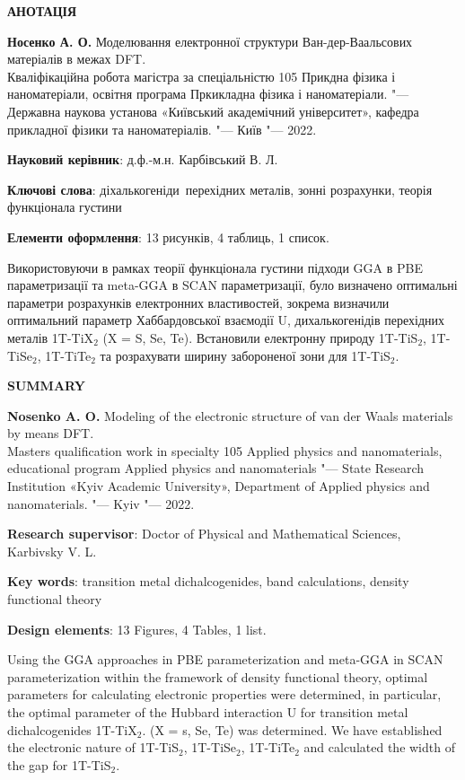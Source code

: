 \begin{center}
{\large \textbf{АНОТАЦІЯ}}
\end{center}

\textbf{Носенко А. О.} Моделювання електронної структури Ван-дер-Ваальсових матеріалів в межах DFT. \\
Кваліфікаційна робота магістра за спеціальністю 105 Прикдна фізика і наноматеріали, освітня програма Пркикладна фізика і наноматеріали. 
"--- Державна наукова установа «Київський академічний університет», кафедра прикладної фізики та наноматеріалів. "--- Київ "--- 2022.

\textbf{Науковий керівник}: д.ф.-м.н. Карбівський В. Л.

\textbf{Ключові слова}: діхалькогеніди перехідних металів, зонні розрахунки, теорія функціонала густини

\textbf{Елементи оформлення}: 13 рисунків, 4 таблиць, 1 список.

Використовуючи в рамках теорії функціонала густини підходи GGA в PBE параметризації та meta-GGA в SCAN параметризації, було визначено оптимальні параметри розрахунків електронних властивостей, зокрема визначили оптимальний параметр Хаббардовської взаємодії U, дихалькогенідів перехідних металів 1T-TiX$_2$ (X = S, Se, Te). Встановили електронну природу 1T-TiS$_2$, 1T-TiSe$_2$, 1T-TiTe$_2$ та розрахувати ширину забороненої зони для 1T-TiS$_2$. 



\bigskip

\clearpage

\thispagestyle{empty}
\begin{center}
{\large \textbf{SUMMARY}}
\end{center}

\textbf{Nosenko A. O.} Modeling of the electronic structure of van der Waals materials by means DFT. \\
Masters qualification work in specialty 105 Applied physics and nanomaterials, educational program Applied physics and nanomaterials "--- State Research Institution «Kyiv Academic University», Department of Applied physics and nanomaterials. "--- Kyiv "--- 2022.

\textbf{Research supervisor}: Doctor of Physical and Mathematical Sciences, \\ Karbivsky V. L.

\textbf{Key words}: transition metal dichalcogenides, band calculations, density functional theory

\textbf{Design elements}: 13 Figures, 4 Tables, 1 list.

Using the GGA approaches in PBE parameterization and meta-GGA in SCAN parameterization within the framework of density functional theory, optimal parameters for calculating electronic properties were determined, in particular, the optimal parameter of the Hubbard interaction U for transition metal dichalcogenides 1T-TiX$_2$. (X = s, Se, Te) was determined. We have established the electronic nature of 1T-TiS$_2$, 1T-TiSe$_2$, 1T-TiTe$_2$ and calculated the width of the gap for 1T-TiS$_2$.
